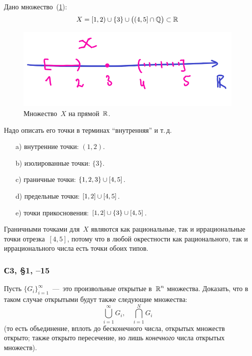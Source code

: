 \documentclass[a4paper,12pt]{article}
\begin{document}
  Дано множество~(\ref{fig:X-subset-on-R}):
  \[
    X = [1, 2) \cup \{3\} \cup \bigl((4, 5] \cap \mathbb Q\bigr) \subset \operatorname{\mathbb R}
  \]

  \begin{figure}[ht]
    \centering
  
    \includegraphics[width=0.5\columnwidth]{X-subset-on-R}
  
    \caption{
      Множество~$X$ на прямой~$\operatorname{\mathbb R}$.
    }
    \label{fig:X-subset-on-R}
  \end{figure}

  Надо описать его точки в терминах ``внутренняя'' и т.\,д.
  
  \begin{solution}
    \par\mbox{}
    \begin{enumerate}  %
        \item[a)] внутренние точки: $(1, 2)$.
        \item[b)] изолированные точки: $\{3\}$.
        \item[c)] граничные точки: $\{1, 2, 3\} \hm\cup [4, 5]$.
        \item[d)] предельные точки: $[1, 2] \hm\cup [4, 5]$.
        \item[e)] точки прикосновения: $[1, 2] \hm\cup \{3\} \hm\cup [4, 5]$.
    \end{enumerate}

    Граничными точками для~$X$ являются как рациональные, так и иррациональные точки отрезка~$[4, 5]$, потому что в любой окрестности как рационального, так и иррационального числа есть точки обоих типов.
  \end{solution}

  
  \subsubsection{С3, \S 1, --15}  %

  Пусть $\{G_i\}_{i = 1}^{\infty}$~---~это произвольные открытые в~$\operatorname{\mathbb R}^n$ множества.
  Доказать, что в таком случае открытыми будут также следующие множества:
  \[
    \bigcup_{i = 1}^{\infty} G_i,\quad \bigcap_{i = 1}^N G_i
  \]
  (то есть объединение, вплоть до бесконечного числа, открытых множеств открыто; также открыто пересечение, но лишь \emph{конечного} числа открытых множеств).
  
\end{document}
